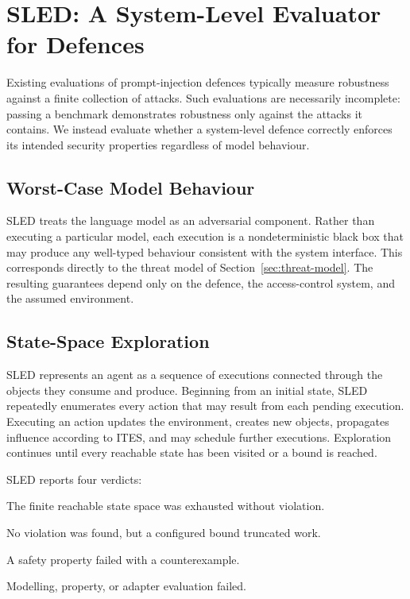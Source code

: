 \documentclass{article}
\begin{document}
\section{SLED: A System-Level Evaluator for Defences}
\label{sec:sled}

Existing evaluations of prompt-injection defences typically measure robustness
against a finite collection of attacks. Such evaluations are necessarily
incomplete: passing a benchmark demonstrates robustness only against the attacks
it contains. We instead evaluate whether a system-level defence correctly
enforces its intended security properties regardless of model behaviour.

\subsection{Worst-Case Model Behaviour}

SLED treats the language model as an adversarial component. Rather than
executing a particular model, each execution is a nondeterministic black box
that may produce any well-typed behaviour consistent with the system interface.
This corresponds directly to the threat model of
Section~\ref{sec:threat-model}. The resulting guarantees depend only on the
defence, the access-control system, and the assumed environment.

\subsection{State-Space Exploration}

SLED represents an agent as a sequence of executions connected through the
objects they consume and produce. Beginning from an initial state, SLED
repeatedly enumerates every action that may result from each pending execution.
Executing an action updates the environment, creates new objects, propagates
influence according to ITES, and may schedule further executions. Exploration
continues until every reachable state has been visited or a bound is reached.

SLED reports four verdicts:
\begin{description}[nosep,leftmargin=*]
\item[\textsc{SAFE}] The finite reachable state space was exhausted without
violation.
\item[\textsc{Bounded\_Safe}] No violation was found, but a configured bound
truncated work.
\item[\textsc{UNSAFE}] A safety property failed with a counterexample.
\item[\textsc{UNKNOWN}] Modelling, property, or adapter evaluation failed.
\end{description}
\end{document}

